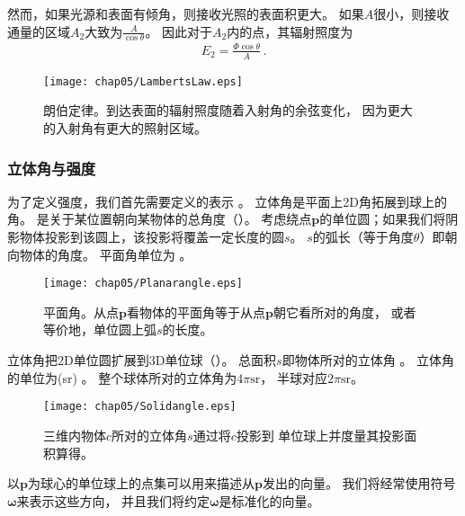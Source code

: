 然而，如果光源和表面有倾角，则接收光照的表面积更大。
如果$A$很小，则接收通量的区域$A_2$大致为$\displaystyle\frac{A}{\cos\theta}$。
因此对于$A_2$内的点，其辐射照度为
\begin{align*}
    E_2=\frac{\varPhi\cos\theta}{A}\, .
\end{align*}

\begin{figure}[htbp]
    \centering\texttt{[image: chap05/LambertsLaw.eps]}
    \caption{朗伯定律。到达表面的辐射照度随着入射角的余弦变化，
        因为更大的入射角有更大的照射区域。}
    \label{fig:5.7}
\end{figure}

\subsubsection*{立体角与强度}
为了定义强度，我们首先需要定义的表示
。
立体角是平面上2D角拓展到球上的角。
是关于某位置朝向某物体的总角度（）。
考虑绕点$\bm p$的单位圆；如果我们将阴影物体投影到该圆上，该投影将覆盖一定长度的圆$s$。
$s$的弧长（等于角度$\theta$）即朝向物体的角度。
平面角单位为
。
\begin{figure}[htbp]
    \centering\texttt{[image: chap05/Planarangle.eps]}
    \caption{平面角。从点$\bm p$看物体的平面角等于从点$\bm p$朝它看所对的角度，
        或者等价地，单位圆上弧$s$的长度。}
    \label{fig:5.8}
\end{figure}

立体角把2D单位圆扩展到3D单位球（）。
总面积$s$即物体所对的立体角
。
立体角的单位为(sr)
。
整个球体所对的立体角为$4\pi \text{sr}$，
半球对应$2\pi \text{sr}$。
\begin{figure}[htbp]
    \centering\texttt{[image: chap05/Solidangle.eps]}
    \caption{三维内物体$c$所对的立体角$s$通过将$c$投影到
        单位球上并度量其投影面积算得。}
    \label{fig:5.9}
\end{figure}

以$\bm p$为球心的单位球上的点集可以用来描述从$\bm p$发出的向量。
我们将经常使用符号$\bm\omega$来表示这些方向，
并且我们将约定$\bm\omega$是标准化的向量。

